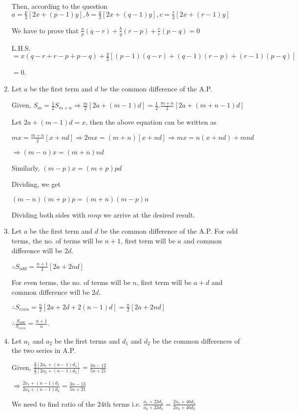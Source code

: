 \begin{enumerate}
  Then, according to the question $a = \frac{p}{2}[2x + (p - 1)y], b = \frac{q}{2}[2x + (q - 1)y], c = \frac{r}{2}[2x + (r - 1)y]$

  We have to prove that $\frac{a}{p}(q - r) + \frac{b}{q}(r - p) + \frac{c}{r}(p - q) = 0$

  L.H.S. $= x(q - r + r - p + p - q) + \frac{y}{2}[(p - 1)(q - r) + (q - 1)(r - p) + (r - 1)(p - q)]$

  $= 0$.
\item Let $a$ be the first term and $d$ be the common difference of the A.P.

  Given, $S_m = \frac{1}{2}S_{m + n}\Rightarrow \frac{m}{2}[2a + (m - 1)d] = \frac{1}{2}.\frac{m + n}{2}[2a + (m + n - 1)d]$

  Let $2a + (m - 1)d = x$, then the above equation can be written as

  $mx = \frac{m + n}{2}[x + nd] \Rightarrow 2mx = (m + n)[x + nd]\Rightarrow mx = n(x + nd) + mnd$

  $\Rightarrow (m - n)x = (m + n)nd$

  Similarly, $(m - p)x = (m + p)pd$

  Dividing, we get

  $(m - n)(m + p)p = (m + n)(m - p)n$

  Dividing both sides with $mnp$ we arrive at the desired result.
\item Let $a$ be the first term and $d$ be the common difference of the A.P. For odd terms, the no. of terms will be $n + 1$, first
  term will be $a$ and common difference will be $2d$.

  $\therefore S_{odd} = \frac{n + 1}{2}[2a + 2nd]$

  For even terms, the no. of terms will be $n$, first term will be $a + d$ and common difference will be $2d$.

  $\therefore S_{even} = \frac{n}{2}[2a + 2d + 2(n - 1)d] = \frac{n}{2}[2a + 2nd]$

  $\therefore \frac{S_{odd}}{S_{even}} = \frac{n + 1}{n}$.
\item Let $a_1$ and $a_2$ be the first terms and $d_1$ and $d_2$ be the common differences of the two series in A.P.

  Given, $\frac{\tfrac{n}{2}[2a_1 + (n - 1)d_1]}{\tfrac{n}{2}[2a_2 + (n - 1)d_2]} = \frac{3n - 12}{5n + 21}$

  $\Rightarrow \frac{2a_1 + (n - 1)d_1}{2a_2 + (n - 1)d_2} = \frac{3n - 13}{5n + 21}$

  We need to find ratio of the $24$th terms i.e. $\frac{a_1 + 23d_1}{a_2 + 23d_2} = \frac{2a_1 + 46d_1}{2a_2 + 46d_2}$


\end{enumerate}
